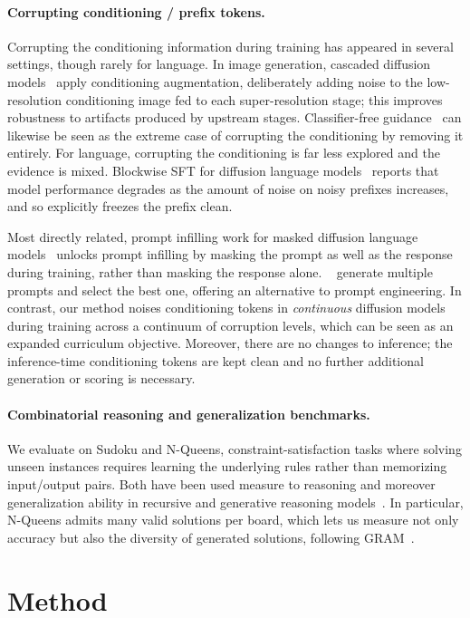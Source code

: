 \documentclass{article}
\begin{document}
\paragraph{Corrupting conditioning / prefix tokens.}
Corrupting the conditioning information during training has appeared in several
settings, though rarely for language. In image generation, cascaded diffusion
models~\citep{cascaded} apply conditioning augmentation, deliberately adding noise to the
low-resolution conditioning image fed to each super-resolution stage; this improves robustness to artifacts produced by upstream
stages. Classifier-free guidance~\citep{cfg} can likewise be seen as the extreme case of corrupting the conditioning by
removing it entirely. For language, corrupting the conditioning is far less explored and the evidence
is mixed. Blockwise SFT for diffusion language models~\citep{blockwise_sft} reports that model performance
degrades as the amount of noise on noisy prefixes increases,
and so explicitly freezes the prefix clean.

Most directly related, prompt infilling work for masked diffusion language
models~\citep{prompt_infill} unlocks prompt infilling by masking the prompt as well as the response
during training, rather than masking the response alone. ~\citep{prompt_infill} generate 
multiple prompts and select the best one, offering an alternative to prompt engineering.
In contrast, our method noises conditioning tokens in \emph{continuous} diffusion models during training 
across a continuum of corruption levels, which can be seen as an expanded curriculum objective.
Moreover, there are no changes to inference; the inference-time conditioning
tokens are kept clean and no further additional generation or scoring is necessary.  

\paragraph{Combinatorial reasoning and generalization benchmarks.}
We evaluate on Sudoku and N-Queens, constraint-satisfaction tasks where solving unseen instances
requires learning the underlying rules rather than memorizing input/output pairs. Both have been used
measure to reasoning and moreover generalization ability in recursive and generative reasoning models~\citep{trm, gram}.
In particular, N-Queens admits many valid solutions per board, which lets us measure not only accuracy but also
the diversity of generated solutions, following 
GRAM~\citep{gram}.

\section{Method}
\label{sec:method}
\end{document}
